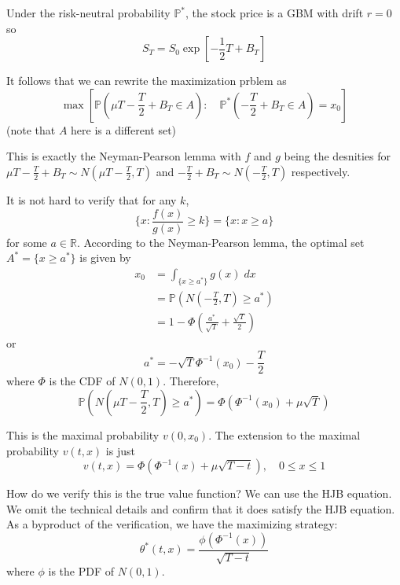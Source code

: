 \documentclass[12pt]{report}
\renewcommand{\P}{\mathbb{P}}
\newcommand{\R}{\mathbb{R}}
\begin{document}
    Under the risk-neutral probability $\P^*$, the stock price is a GBM with drift $r = 0$ so
    \[S_T = S_0 \exp\left[-\frac{1}{2}T + B_T\right]\]

    It follows that we can rewrite the maximization prblem as 
    \[\max\left[\P\left(\mu T - \frac{T}{2} + B_T \in A\right): \quad \P^*\left(-\frac{T}{2} + B_T \in A\right) = x_0  \right]\]
    (note that $A$ here is a different set)

    This is exactly the Neyman-Pearson lemma with $f$ and $g$ being the desnities for $\mu T - \frac{T}{2} + B_T \sim N(\mu T - \frac{T}{2}, T)$ and $-\frac{T}{2} + B_T \sim N(-\frac{T}{2}, T)$ respectively.

    It is not hard to verify that for any $k$, 
    \[\{x: \frac{f(x)}{g(x)} \geq k\} = \{x: x \geq a\}\]
    for some $a \in \R$. According to the Neyman-Pearson lemma, the optimal set $A^* = \{x \geq a^*\}$ is given by 
    \begin{align*}
        x_0 &= \int_{\{x \geq a^*\}}g(x)\; dx\\ 
            &= \P\left(N(-\frac{T}{2}, T) \geq a^*\right)\\ 
            &= 1 - \Phi\left(\frac{a^*}{\sqrt{T}} + \frac{\sqrt T}{2}\right)
    \end{align*}
    or 
    \[a^* = -\sqrt T \Phi^{-1}(x_0) - \frac{T}{2}\]
    where $\Phi$ is the CDF of $N(0, 1)$. Therefore, 
    \[\P\left(N(\mu T - \frac{T}{2}, T) \geq a^*\right) = \Phi(\Phi^{-1}(x_0) + \mu\sqrt T)\]

    This is the maximal probability $v(0, x_0)$. The extension to the maximal probability $v(t, x)$ is just 
    \[v(t, x) = \Phi(\Phi^{-1}(x) + \mu\sqrt{T - t}), \quad 0 \leq x \leq 1\]

    How do we verify this is the true value function? We can use the HJB equation. We omit the technical details and confirm that it does satisfy the HJB equation. As a byproduct of the verification, we have the maximizing strategy:
    \[\theta^*(t, x) = \frac{\phi(\Phi^{-1}(x))}{\sqrt{T - t}}\]
    where $\phi$ is the PDF of $N(0, 1)$.
    
\end{document}
